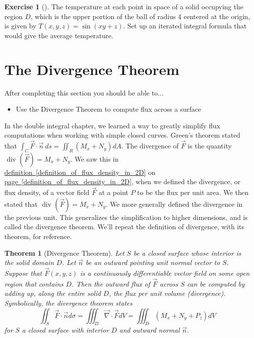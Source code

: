 \documentclass[10pt,]{book}
\theoremstyle{plain}
\newtheorem{theorem}{Theorem}[section]
\theoremstyle{definition}
\theoremstyle{definition}
\theoremstyle{definition}
\theoremstyle{definition}
\newtheorem{exploration}[project]{Exercise}
\theoremstyle{definition}
\numberwithin{equation}{section}
\begin{document}
\begin{exploration}[]\label{exploration-309}
The temperature at each point in space of a solid occupying the region {\(D\)}, which is the upper portion of the ball of radius 4 centered at the origin, is given by \(T(x,y,z) = \sin(xy+z)\). Set up an iterated integral formula that would give the average temperature.%
\end{exploration}
\typeout{************************************************}
\typeout{************************************************}
\section[{The Divergence Theorem}]{The Divergence Theorem}\label{section-47}
After completing this section you should be able to... \leavevmode%
\begin{itemize}[label=\textbullet]
\item{}Use the Divergence Theorem to compute flux across a surface%
\end{itemize}
%
\par
In the double integral chapter, we learned a way to greatly simplify flux computations when working with simple closed curves. Green's theorem stated that \(\int_C \vec F\cdot \vec n\ ds = \iint_R (M_x+N_y) dA\). The divergence of \(\vec F\) is the quantity \(\text{ div } (\vec F) = M_x+N_y\). We saw this in \hyperref[definition_of_flux_density_in_2D]{definition~\ref{definition_of_flux_density_in_2D}} on \hyperref[definition_of_flux_density_in_2D]{page~\ref{definition_of_flux_density_in_2D}}, when we defined the divergence, or flux density, of a vector field \(\vec F\) at a point \(P\) to be the flux per unit area. We then stated that \(\text{ div } (\vec F)=M_x+N_y\). We more generally defined the divergence in the previous unit. This generalizes the simplification to higher dimensions, and is called the divergence theorem. We'll repeat the definition of divergence, with its theorem, for reference.%
\begin{theorem}[{Divergence Theorem}]\label{theorem-15}
Let \(S\) be a closed surface whose interior is the solid domain \(D\). Let \(\vec n\) be an outward pointing unit normal vector to \(S\). Suppose that \(\vec F(x,y,z)\) is a continuously differentiable vector field on some open region that contains \(D\). Then the outward flux of \(\vec F\) across \(S\) can be computed by adding up, along the entire solid \(D\), the flux per unit volume (divergence). Symbolically, the divergence theorem states%
\begin{equation*}
\iint_S\vec F\cdot \vec n d\sigma =  \iiint_D \vec \nabla \cdot \vec F dV = \iiint_D \left(M_x+N_y+P_z\right) dV
\end{equation*}
for \(S\) a closed surface with interior \(D\) and outward normal \(\vec n\).%
\end{theorem}
\end{document}
